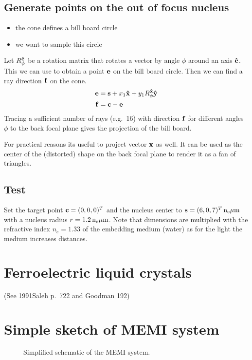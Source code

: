 \documentclass[twocolumn,DIV19]{scrartcl}
\begin{document}
\subsection{Generate points on the out of focus nucleus}
\begin{itemize}
\item the cone defines a bill board circle
\item we want to sample this circle
\end{itemize}
Let $R_\phi^{\mathbf{\hat{c}}}$ be a rotation matrix that rotates a vector by angle
$\phi$ around an axis $\mathbf{\hat{c}}$. This we can use to obtain a point $\mathbf{e}$
on the bill board circle. Then we can find a ray direction $\mathbf{f}$ on the
cone.
\begin{align}
  \mathbf{e}&=\mathbf{s}+x_1\mathbf{\hat{x}}+y_1R_\phi^{\mathbf{\hat{x}}}\mathbf{\hat{y}}\\
  \mathbf{f}&=\mathbf{c}-\mathbf{e}
\end{align}
Tracing a sufficient number of rays (e.g.\ 16) with direction $\mathbf{f}$ for
different angles $\phi$ to the back focal plane gives the projection
of the bill board.

For practical reasons its useful to project vector $\mathbf{x}$ as well. It
can be used as the center of the (distorted) shape on the back focal
plane to render it as a fan of triangles.
\subsection{Test}
Set the target point $\mathbf{c}=(0,0,0)^T$ and the nucleus center to
$\s=\unit[(6,0,7)^T]{n_e \mu m}$ with a nucleus radius
$r=\unit[1.2]{n_e \mu m}$. Note that dimensions are multiplied with
the refractive index $n_e=1.33$ of the embedding medium (water) as for
the light the medium increases distances.

\section{Ferroelectric liquid crystals}
(See 1991Saleh p.~722 and Goodman 192)

\section{Simple sketch of MEMI system}
\begin{figure}[!hbt]
  \centering
  
  \caption{Simplified schematic of the MEMI system.}
\end{figure}
\end{document}
